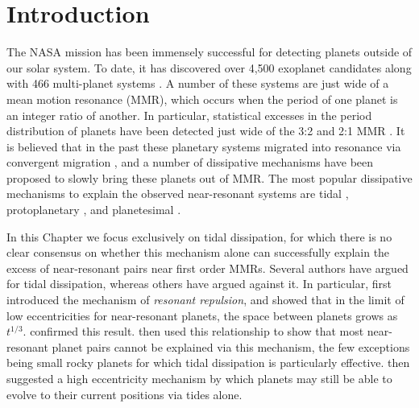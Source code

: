 \section{Introduction}
\label{sec:introduction}
The NASA \kep{} mission has been immensely successful for detecting planets outside of our solar system.
To date, it has discovered over 4,500 exoplanet candidates along with 466 multi-planet systems \citep{Akeson2013,Rowe2014}. 
A number of these systems are just wide of a mean motion resonance (MMR), which occurs when the period of one planet is an integer ratio of another. 
In particular, statistical excesses in the period distribution of \kep{} planets have been detected just wide of the 3:2 and 2:1 MMR \citep[][]{Lissauer2011,Fabrycky2014,Steffen2015}.
It is believed that in the past these planetary systems migrated into resonance via convergent migration \citep{Lee2002}, and a number of dissipative mechanisms have been proposed to slowly bring these planets out of MMR.
The most popular dissipative mechanisms to explain the observed near-resonant systems are tidal \citep{LithwickWu2012, Batygin2013, Delisle2014},  protoplanetary \citep{Rein2012b, Baruteau2013, Goldreich2014}, and planetesimal \citep{Moore2013, Chatterjee2015}. 

In this Chapter we focus exclusively on tidal dissipation, for which there is no clear consensus on whether this mechanism alone can successfully explain the excess of near-resonant pairs near first order MMRs. 
Several authors \citep{LithwickWu2012,Batygin2013} have argued for \citep{Delisle2014} tidal dissipation, whereas others \citep{Lee2013} have argued against it. 
In particular, \citet{LithwickWu2012} first introduced the mechanism of \textit{resonant repulsion}, and showed that in the limit of low eccentricities for near-resonant planets, the space between planets grows as~$t^{1/3}$.
\citet{Batygin2013} confirmed this result.
\citet{Lee2013} then used this relationship to show that most near-resonant planet pairs cannot be explained via this mechanism, the few exceptions being small rocky planets for which tidal dissipation is particularly effective.
\citet{Delisle2014} then suggested a high eccentricity mechanism by which planets may still be able to evolve to their current positions via tides alone.

